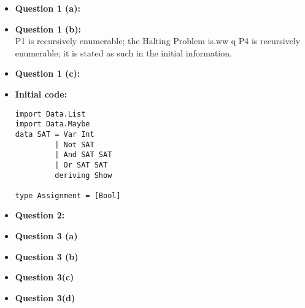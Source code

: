 \documentclass[12pt]{article}
\begin{document}
\maketitle
\begin{itemize}
  \item \textbf{Question 1 (a):}\\
  \item \textbf{Question 1 (b):}\\
    P1 is recursively enumerable; the Halting Problem is.ww q
    P4 is recursively enumerable; it is stated as such in the initial information.\\
\item \textbf{Question 1 (c):}\\

\item \textbf{Initial code:}
\begin{lstlisting}
import Data.List
import Data.Maybe
data SAT = Var Int
         | Not SAT
         | And SAT SAT
         | Or SAT SAT
         deriving Show

type Assignment = [Bool]
\end{lstlisting}

\item \textbf{Question 2:}
  

\item \textbf{Question 3 (a)}
  

\item \textbf{Question 3 (b)}
  

\item \textbf{Question 3(c)}
  

\item \textbf{Question 3(d)}
  
\end{itemize}
\end{document}
